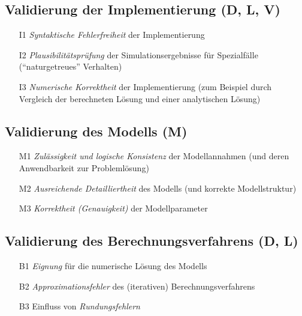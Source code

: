         \subsection{Validierung der Implementierung (D, L, V)} %
            \begin{itemize}
            	\item[I1] \textit{Syntaktische Fehlerfreiheit} der Implementierung
            	\item[I2] \textit{Plausibilitätsprüfung} der Simulationsergebnisse für Spezialfälle (\enquote{naturgetreues} Verhalten)
            	\item[I3] \textit{Numerische Korrektheit} der Implementierung (zum Beispiel durch Vergleich der berechneten Lösung und einer analytischen Lösung)
            \end{itemize}

        \subsection{Validierung des Modells (M)} %
            \begin{itemize}
            	\item[M1] \textit{Zulässigkeit und logische Konsistenz} der Modellannahmen (und deren Anwendbarkeit zur Problemlösung)
            	\item[M2] \textit{Ausreichende Detailliertheit} des Modells (und korrekte Modellstruktur)
            	\item[M3] \textit{Korrektheit (Genauigkeit)} der Modellparameter
            \end{itemize}

        \subsection{Validierung des Berechnungsverfahrens (D, L)} %
            \begin{itemize}
            	\item[B1] \textit{Eignung} für die numerische Lösung des Modells
            	\item[B2] \textit{Approximationsfehler} des (iterativen) Berechnungsverfahrens
            	\item[B3] Einfluss von \textit{Rundungsfehlern}
            \end{itemize}

